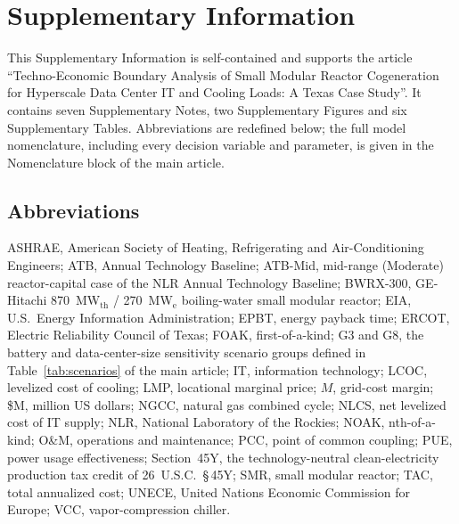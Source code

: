 \documentclass[a4paper,fleqn]{cas-sc}
\begin{document}
\section*{Supplementary Information}

This Supplementary Information is self-contained and supports the article ``Techno-Economic Boundary Analysis of Small Modular Reactor Cogeneration for Hyperscale Data Center IT and Cooling Loads: A Texas Case Study''. It contains seven Supplementary Notes, two Supplementary Figures and six Supplementary Tables. Abbreviations are redefined below; the full model nomenclature, including every decision variable and parameter, is given in the Nomenclature block of the main article.

\subsection*{Abbreviations}
{\small\noindent
ASHRAE, American Society of Heating, Refrigerating and Air-Conditioning Engineers;
ATB, Annual Technology Baseline;
ATB-Mid, mid-range (Moderate) reactor-capital case of the NLR Annual Technology Baseline;
BWRX-300, GE-Hitachi 870~MW$_\mathrm{th}$ / 270~MW$_\mathrm{e}$ boiling-water small modular reactor;
EIA, U.S.\ Energy Information Administration;
EPBT, energy payback time;
ERCOT, Electric Reliability Council of Texas;
FOAK, first-of-a-kind;
G3 and G8, the battery and data-center-size sensitivity scenario groups defined in Table~\ref{tab:scenarios} of the main article;
IT, information technology;
LCOC, levelized cost of cooling;
LMP, locational marginal price;
$M$, grid-cost margin;
\$M, million US dollars;
NGCC, natural gas combined cycle;
NLCS, net levelized cost of IT supply;
NLR, National Laboratory of the Rockies;
NOAK, nth-of-a-kind;
O\&M, operations and maintenance;
PCC, point of common coupling;
PUE, power usage effectiveness;
Section~45Y, the technology-neutral clean-electricity production tax credit of 26~U.S.C.~\S\,45Y;
SMR, small modular reactor;
TAC, total annualized cost;
UNECE, United Nations Economic Commission for Europe;
VCC, vapor-compression chiller.
\par}
\end{document}
